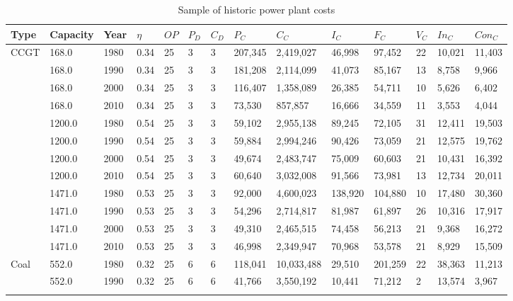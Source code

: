 \begin{table}[]
	\caption{Sample of historic power plant costs \cite{IRENA2018,IEA2015,OWPB2016}} 
	\begin{tabular}{|l|l|l|l|l|l|l|l|l|l|l|l|l|l|}
		\hline
		Type & Capacity & Year & $\eta$ & $OP$ & $P_D$ & $C_D$ & $P_C$ & $C_C$ & $I_C$ & $F_C$ & $V_C$ & $In_C$ & $Con_C$ \\ \hline
		\multirow{12}{*}{CCGT} & 168.0 & 1980 & 0.34 & 25 & 3 & 3 & 207,345 & 2,419,027 & 46,998 & 97,452 & 22 & 10,021 & 11,403 \\ \cline{2-14} 
		& 168.0 & 1990 & 0.34 & 25 & 3 & 3 & 181,208 & 2,114,099 & 41,073 & 85,167 & 13 & 8,758 & 9,966 \\ \cline{2-14} 
		& 168.0 & 2000 & 0.34 & 25 & 3 & 3 & 116,407 & 1,358,089 & 26,385 & 54,711 & 10 & 5,626 & 6,402 \\ \cline{2-14} 
		& 168.0 & 2010 & 0.34 & 25 & 3 & 3 & 73,530 & 857,857 & 16,666 & 34,559 & 11 & 3,553 & 4,044 \\ \cline{2-14} 
		& 1200.0 & 1980 & 0.54 & 25 & 3 & 3 & 59,102 & 2,955,138 & 89,245 & 72,105 & 31 & 12,411 & 19,503 \\ \cline{2-14} 
		& 1200.0 & 1990 & 0.54 & 25 & 3 & 3 & 59,884 & 2,994,246 & 90,426 & 73,059 & 21 & 12,575 & 19,762 \\ \cline{2-14} 
		& 1200.0 & 2000 & 0.54 & 25 & 3 & 3 & 49,674 & 2,483,747 & 75,009 & 60,603 & 21 & 10,431 & 16,392 \\ \cline{2-14} 
		& 1200.0 & 2010 & 0.54 & 25 & 3 & 3 & 60,640 & 3,032,008 & 91,566 & 73,981 & 13 & 12,734 & 20,011 \\ \cline{2-14} 
		& 1471.0 & 1980 & 0.53 & 25 & 3 & 3 & 92,000 & 4,600,023 & 138,920 & 104,880 & 10 & 17,480 & 30,360 \\ \cline{2-14} 
		& 1471.0 & 1990 & 0.53 & 25 & 3 & 3 & 54,296 & 2,714,817 & 81,987 & 61,897 & 26 & 10,316 & 17,917 \\ \cline{2-14} 
		& 1471.0 & 2000 & 0.53 & 25 & 3 & 3 & 49,310 & 2,465,515 & 74,458 & 56,213 & 21 & 9,368 & 16,272 \\ \cline{2-14} 
		& 1471.0 & 2010 & 0.53 & 25 & 3 & 3 & 46,998 & 2,349,947 & 70,968 & 53,578 & 21 & 8,929 & 15,509 \\ \hline
		\multirow{24}{*}{Coal} & 552.0 & 1980 & 0.32 & 25 & 6 & 6 & 118,041 & 10,033,488 & 29,510 & 201,259 & 22 & 38,363 & 11,213 \\ \cline{2-14} 
		& 552.0 & 1990 & 0.32 & 25 & 6 & 6 & 41,766 & 3,550,192 & 10,441 & 71,212 & 2 & 13,574 & 3,967 \\ \cline{2-14} 

\end{tabular}
\end{table}
